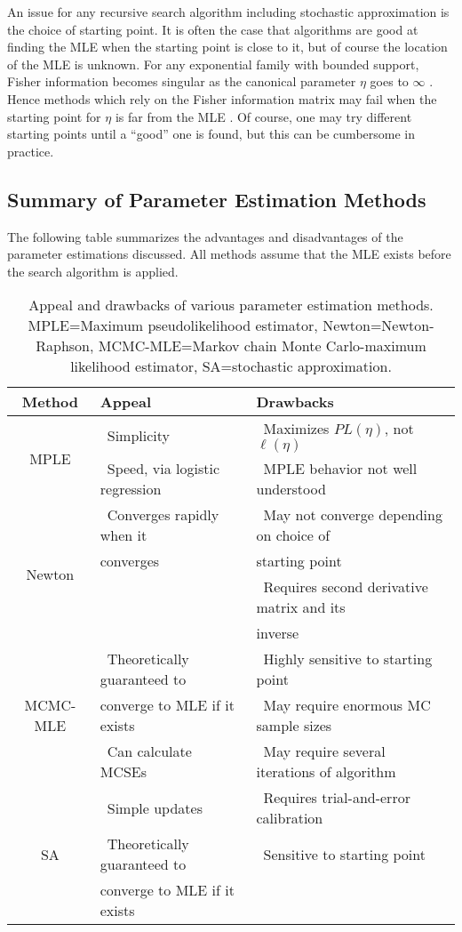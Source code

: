 An issue for any recursive search algorithm including stochastic approximation is the 
choice of starting point.  It is 
often the case that algorithms are good at finding the MLE when the starting point is 
close to it, but of course the 
location of the MLE is unknown.  For any exponential family with bounded support, 
Fisher information 
becomes singular as the canonical parameter $\eta$ goes to $\infty$ \citep*{Rinaldo:2009}.
Hence methods which rely on 
the Fisher information matrix may fail when the starting point for $\eta$ is far from 
the MLE \citep{Younes:1989,Gu:2001}.
Of course, one may try different starting points until a ``good'' one is found, but 
this can be cumbersome in 
practice.

\subsection{Summary of Parameter Estimation Methods}
The following table summarizes the advantages and disadvantages of the parameter estimations discussed.  
All methods assume that the MLE exists before the search algorithm is applied.

\begin{table}[h] 
\caption{Appeal and drawbacks of various parameter estimation methods. MPLE=Maximum pseudolikelihood estimator, Newton=Newton-Raphson,
MCMC-MLE=Markov chain Monte Carlo-maximum likelihood estimator, SA=stochastic approximation.}
\begin{tabular}{|c|l|l|}
\hline 
Method & Appeal & Drawbacks \\ [1ex]
\hline
\multirow{2}{0.5in}{MPLE}		
& 	\textbullet \, Simplicity 				  	& \textbullet \, Maximizes $PL(\eta)$, not $\ell(\eta)$  \\
& 	\textbullet \, Speed, via logistic regression 	& \textbullet \, MPLE behavior not well understood \\ [1ex]
\hline
\multirow{4}{0.5in}{Newton}
& 	\textbullet \, Converges rapidly when it   	& \textbullet \, May not converge depending on choice of\\ 
& 	converges 	& starting point \\				
&				& \textbullet \, Requires second derivative matrix and its\\
&				& inverse \\[1ex]
\hline
\multirow{3}{0.5in}{MCMC-MLE}
& 	\textbullet \, Theoretically guaranteed to   	& \textbullet \, Highly sensitive to starting point \\ 
& 	converge to MLE if it exists 					& \textbullet \, May require enormous MC sample sizes\\ 
&	\textbullet \, Can calculate MCSEs			& \textbullet \, May require several iterations of algorithm\\ [1ex]
\hline
\multirow{3}{0.5in}{SA} 		
& 	\textbullet \, Simple updates 				& \textbullet \, Requires trial-and-error calibration  \\			& 	\textbullet \, Theoretically guaranteed to		& \textbullet \, Sensitive to starting point \\
& 	converge to MLE if it exists & \\[1ex]
\hline 
\end{tabular}
\end{table}

